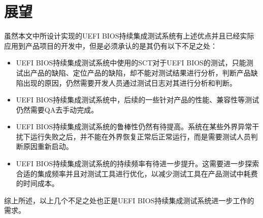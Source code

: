 \section{展望}

	虽然本文中所设计实现的UEFI BIOS持续集成测试系统有上述优点并且已经实际应用到产品项目的开发中，但是必须承认的是其仍有以下不足之处：
	
	\begin{itemize}
		\item UEFI BIOS持续集成测试系统中使用的SCT对于UEFI BIOS的测试，只能测试出产品的缺陷、定位产品的缺陷，却不能对测试结果进行分析，判断产品缺陷出现的原因，仍然需要开发人员通过测试日志对其进行分析和判断。
		\item UEFI BIOS持续集成测试系统中，后续的一些针对产品的性能、兼容性等测试仍然需要QA去手动完成。
		\item UEFI BIOS持续集成测试系统的鲁棒性仍然有待提高。系统在某些外界异常干扰下运行失败之后，并不能在外界恢复正常后正常运行，而是需要测试人员判断原因重新启动。
		\item UEFI BIOS持续集成测试系统的持续频率有待进一步提升。这需要进一步探索合适的集成频率并且对测试工具进行优化，以减少测试工具在产品测试中耗费的时间成本。
	\end{itemize}
	
	综上所述，以上几个不足之处也正是UEFI BIOS持续集成测试系统进一步工作的需求。